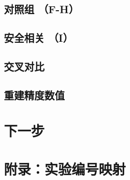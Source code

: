 \documentclass[fontset=fandol,aspectratio=169,11pt]{ctexbeamer}
\begin{document}
\subsection{对照组 （F-H）}




\subsection{安全相关 （I）}


\subsection{交叉对比}


\subsection{重建精度数值}

\section{下一步}



\appendix
\section{附录：实验编号映射}

\end{document}
